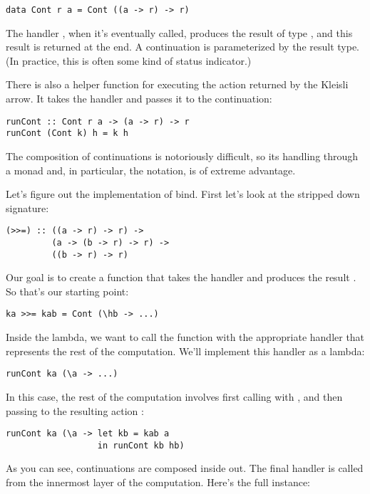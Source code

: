 \begin{Verbatim}[commandchars=\\\{\}]
data Cont r a = Cont ((a -> r) -> r)
\end{Verbatim}
The handler , when it's eventually called,
produces the result of type , and this result is returned at
the end. A continuation is parameterized by the result type. (In
practice, this is often some kind of status indicator.)

There is also a helper function for executing the action returned by the
Kleisli arrow. It takes the handler and passes it to the continuation:

\begin{Verbatim}[commandchars=\\\{\}]
runCont :: Cont r a -> (a -> r) -> r
runCont (Cont k) h = k h
\end{Verbatim}
The composition of continuations is notoriously difficult, so its
handling through a monad and, in particular, the  notation,
is of extreme advantage.

Let's figure out the implementation of bind. First let's look at the
stripped down signature:

\begin{Verbatim}[commandchars=\\\{\}]
(>>=) :: ((a -> r) -> r) ->
         (a -> (b -> r) -> r) ->
         ((b -> r) -> r)
\end{Verbatim}
Our goal is to create a function that takes the handler
 and produces the result . So
that's our starting point:

\begin{Verbatim}
ka >>= kab = Cont (\hb -> ...)
\end{Verbatim}
Inside the lambda, we want to call the function  with the
appropriate handler that represents the rest of the computation. We'll
implement this handler as a lambda:

\begin{Verbatim}
runCont ka (\a -> ...)
\end{Verbatim}
In this case, the rest of the computation involves first calling
 with , and then passing  to the
resulting action :

\begin{Verbatim}
runCont ka (\a -> let kb = kab a 
                  in runCont kb hb)
\end{Verbatim}
As you can see, continuations are composed inside out. The final handler
 is called from the innermost layer of the computation.
Here's the full instance:

